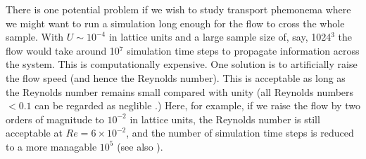 There is one potential problem if we wish to study transport
phemonema where we might want to run a simulation long enough
for the flow to cross the whole sample. With $U \sim 10^{-4}$
in lattice units and a large sample size of, say,  1024$^3$ the
flow would take around 10$^7$ simulation time steps to propagate
information across the system. This is computationally expensive.
One solution is
to artificially raise the flow speed (and hence the Reynolds
number). This is acceptable as long as the Reynolds number
remains small compared with unity (all Reynolds numbers $< 0.1$
can be regarded as neglible \cite{batchelor}.) Here, for example,
if we raise the flow by two orders of magnitude to $10^{-2}$ in
lattice units,
the Reynolds number is still acceptable at $Re = 6\times 10^{-2}$,
and the number of simulation time steps is reduced to a more
managable $10^5$ (see also \cite{cates_scaling}).

